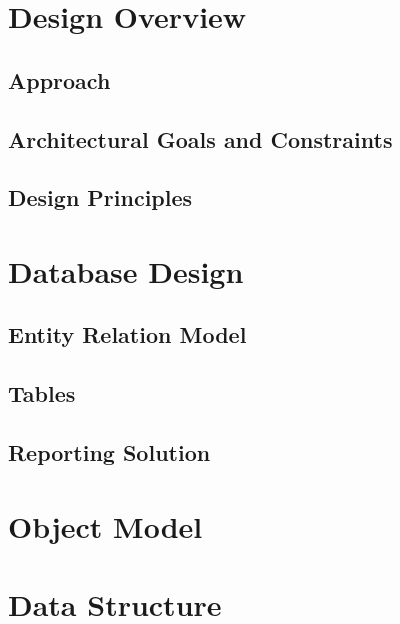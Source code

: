 \documentclass[]{article}
\begin{document}

	\section{Design Overview}

	
	\subsection{Approach}

	
	\subsection{Architectural Goals and Constraints}

	
	\subsection{Design Principles}

	
	\section{Database Design}

	
	\subsection{Entity Relation Model}

	
	\subsection{Tables}

	
	\subsection{Reporting Solution}

	
	\section{Object Model}

	
	\section{Data Structure}
\end{document}
